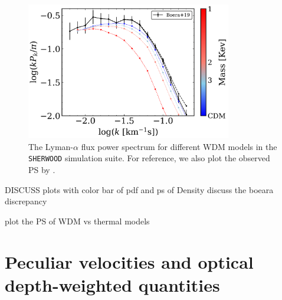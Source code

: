 \begin{figure}
        \centering
        \includegraphics[width=0.8\textwidth]{img/ML/PS_sherwood.png}
        \caption{The Lyman-$\alpha$ flux power spectrum for different WDM models in the \texttt{SHERWOOD} simulation suite. For reference, we also plot the observed PS by \cite{Boera_2019}.}
        \label{fig: sherwood exact PS}     
\end{figure}


DISCUSS plots with color bar of pdf and ps of Density discuss the boeara discrepancy

plot the PS of WDM vs thermal models


\section{Peculiar velocities and optical depth-weighted quantities}\label{sec: optical depth weighted}